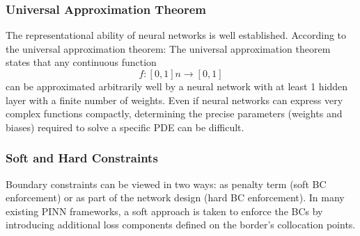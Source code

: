 \documentclass{article}
\begin{document}



\subsubsection{Universal Approximation Theorem}

The representational ability of neural networks is well established. According to the universal approximation theorem:
The universal approximation theorem states that any continuous function  $$f : [0, 1]n \rightarrow [0, 1]$$  can be approximated arbitrarily well by a neural network with at least 1 hidden layer with a finite number of weights.
Even if neural networks can express very complex functions compactly, determining the precise parameters (weights and biases) required to solve a specific PDE can be difficult.




\subsubsection{Soft and Hard Constraints}

Boundary constraints can be viewed in two ways: as penalty term (soft BC enforcement) or as part of the network design (hard BC enforcement). In many existing PINN frameworks, a soft approach is taken to enforce the BCs by introducing additional loss components defined on the border's collocation points.
\end{document}
